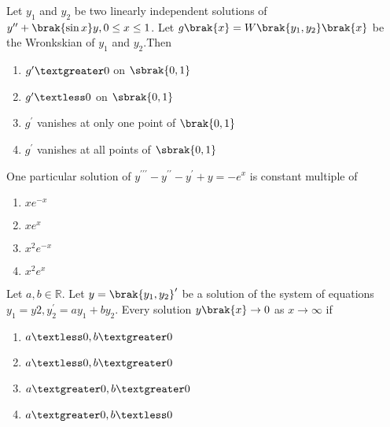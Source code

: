 \iffalse
	\title{2008-MA-35-51}
	\author{EE24Btech11006 - Arnav Mahishi}
	\section{ma}
	\chapter{2008}
\fi
\item{
Let $y_1$ and $y_2$ be two linearly independent solutions of $y^{\prime\prime}+\brak{\sin x}y,0\leq x\leq1$. Let $g\brak{x}=W\brak{y_1,y_2}\brak{x}$ be the Wronkskian of $y_1$ and $y_2$.Then   
\begin{multicols}{2}
\begin{enumerate}
\item$g^{\prime}\textgreater0$ on $\sbrak{0,1}$
\item$g^{\prime}\textless0$ on $\sbrak{0,1}$
\item$g^{\prime}$ vanishes at only one point of $\brak{0,1}$
\item$g^{\prime}$ vanishes at all points of $\sbrak{0,1}$
\end{enumerate}
\end{multicols}
}
\item{
One particular solution of $y^{\prime\prime\prime}-y^{\prime\prime}-y^{\prime}+y=-e^x$ is constant multiple of 
\begin{multicols}{4}
\begin{enumerate}
\item $xe^{-x}$
\item $xe^x$
\item $x^2e^{-x}$
\item $x^2e^x$
\end{enumerate}
\end{multicols}}
\item{
Let $a,b\in\mathbb{R}$. Let $y=\brak{y_1,y_2}^{\prime}$ be a solution of the system of equations $y_1=y2,y_2^{\prime}=ay_1+by_2$. Every solution $y\brak{x}\rightarrow 0$ as $x\rightarrow\infty$ if
\begin{multicols}{4}
\begin{enumerate}
\item $a\textless0,b\textgreater0$
\item $a\textless0,b\textgreater0$
\item $a\textgreater0,b\textgreater0$
\item $a\textgreater0,b\textless0$
\end{enumerate}
\end{multicols}
}
